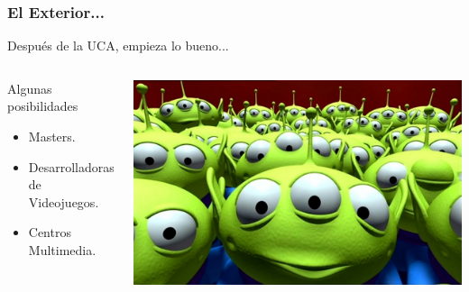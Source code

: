 
\begin{frame}
	\frametitle{El Exterior...}
		
	Después de la UCA, empieza lo bueno...

	\begin{columns}[c]
		\column{150pt}
			\begin{block}{Algunas posibilidades}
				\begin{itemize}
					\item Masters.
					\item Desarrolladoras de Videojuegos.
					\item Centros Multimedia.
				\end{itemize}
			\end{block}
		\column{150pt}
			\begin{center}
				\includegraphics[scale=0.15]{img/exterior.jpg}
			\end{center}
	\end{columns}
\end{frame}


